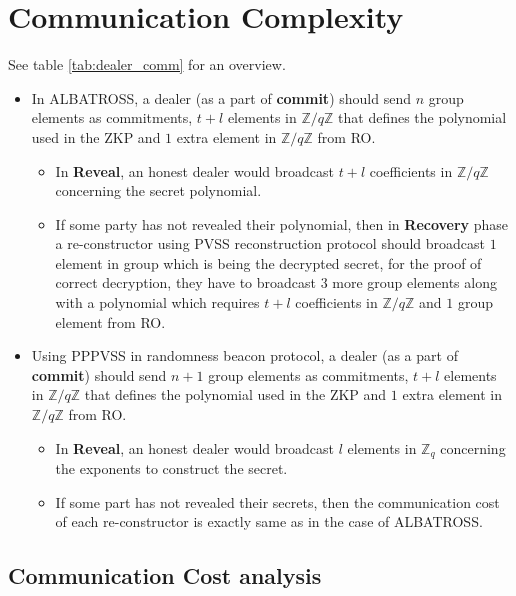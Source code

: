 \section{Communication Complexity}

See table \ref{tab:dealer_comm} for an overview.
\begin{itemize}
    \item In ALBATROSS, a dealer (as a part of \textbf{commit}) should send $n$ group elements as commitments, $t+l$ elements in $\mathbb{Z}/q\mathbb{Z}$ that defines the polynomial used in the ZKP and $1$ extra element in $\mathbb{Z}/q\mathbb{Z}$ from RO. 
    \begin{itemize}
        \item In \textbf{Reveal}, an honest dealer would broadcast $t+l$ coefficients in $\mathbb{Z}/q\mathbb{Z}$ concerning the secret polynomial.
        \item If some party has not revealed their polynomial, then in \textbf{Recovery} phase a re-constructor using PVSS reconstruction protocol should broadcast $1$ element in group which is being the decrypted secret, for the proof of correct decryption, they have to broadcast $3$ more group elements along with a polynomial which requires $t+l$ coefficients in $\mathbb{Z}/q\mathbb{Z}$ and $1$ group element from RO.
    \end{itemize}
    \item Using PPPVSS in randomness beacon protocol, a dealer (as a part of \textbf{commit}) should send $n+1$ group elements as commitments, $t+l$ elements in $\mathbb{Z}/q\mathbb{Z}$ that defines the polynomial used in the ZKP and $1$ extra element in $\mathbb{Z}/q\mathbb{Z}$ from RO.
    \begin{itemize}
        \item In \textbf{Reveal}, an honest dealer would broadcast $l$ elements in $\mathbb{Z}_q$ concerning the exponents to construct the secret.
        \item If some part has not revealed their secrets, then the communication cost of each re-constructor is exactly same as in the case of ALBATROSS.
    \end{itemize}
\end{itemize}

\subsection{Communication Cost analysis}

